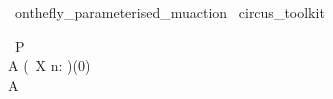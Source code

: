 \begin{zsection}
  \SECTION\ onthefly\_parameterised\_muaction \parents\ circus\_toolkit
\end{zsection}

\begin{circus}
   \circprocess\ P \circdef \circbegin \\
        A \circdef (\circmu\ X \circspot n: \nat \circspot \Skip)(0) \\
        \circspot A \\
   \circend
\end{circus}
